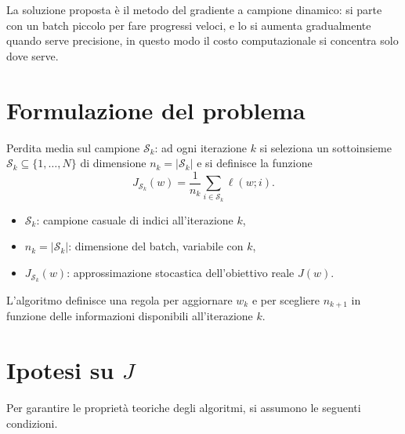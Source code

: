 \documentclass[italian, a4paper, twoside, binding=6mm]{sapthesis}
\begin{document}
La soluzione proposta è il metodo del gradiente a campione dinamico: si parte con un batch piccolo per fare progressi veloci, e lo si aumenta gradualmente quando serve precisione, in questo modo il costo computazionale si concentra solo dove serve.


\section{Formulazione del problema}

\begin{definitionbox}
  Perdita media sul campione $\mathcal{S}_k$: ad ogni iterazione $k$ si seleziona un sottoinsieme $\mathcal{S}_k \subseteq \{1,\dots,N\}$ di dimensione $n_k = |\mathcal{S}_k|$ e si definisce la funzione
  \[
    J_{\mathcal{S}_k}(w) = \frac{1}{n_k} \sum_{i \in \mathcal{S}_k} \ell(w;i).
  \]
  \begin{itemize}
    \item $\mathcal{S}_k$: campione casuale di indici all'iterazione $k$,
    \item $n_k = |\mathcal{S}_k|$: dimensione del batch, variabile con $k$,
    \item $J_{\mathcal{S}_k}(w)$: approssimazione stocastica dell'obiettivo reale $J(w)$.
  \end{itemize}
  L'algoritmo definisce una regola per aggiornare $w_k$ e per scegliere $n_{k+1}$ in funzione delle informazioni disponibili all'iterazione $k$.
\end{definitionbox}

\section{Ipotesi su $J$}

Per garantire le propriet\`a teoriche degli algoritmi, si assumono le seguenti condizioni.
\end{document}
